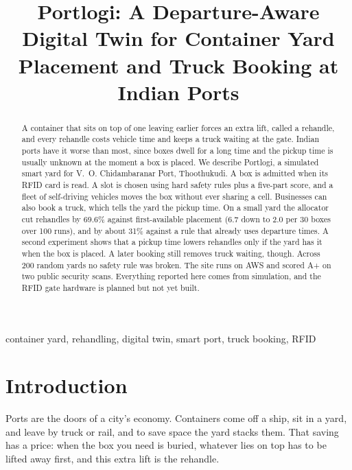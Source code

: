 \documentclass[conference]{IEEEtran}
\begin{document}
\title{Portlogi: A Departure-Aware Digital Twin for Container Yard Placement and Truck Booking at Indian Ports}

\author{
}

\maketitle

\begin{abstract}
A container that sits on top of one leaving earlier forces an extra lift, called a rehandle, and every rehandle costs vehicle time and keeps a truck waiting at the gate. Indian ports have it worse than most, since boxes dwell for a long time and the pickup time is usually unknown at the moment a box is placed. We describe Portlogi, a simulated smart yard for V.~O. Chidambaranar Port, Thoothukudi. A box is admitted when its RFID card is read. A slot is chosen using hard safety rules plus a five-part score, and a fleet of self-driving vehicles moves the box without ever sharing a cell. Businesses can also book a truck, which tells the yard the pickup time. On a small yard the allocator cut rehandles by 69.6\% against first-available placement (6.7 down to 2.0 per 30 boxes over 100 runs), and by about 31\% against a rule that already uses departure times. A second experiment shows that a pickup time lowers rehandles only if the yard has it when the box is placed. A later booking still removes truck waiting, though. Across 200 random yards no safety rule was broken. The site runs on AWS and scored A+ on two public security scans. Everything reported here comes from simulation, and the RFID gate hardware is planned but not yet built.
\end{abstract}

\begin{IEEEkeywords}
container yard, rehandling, digital twin, smart port, truck booking, RFID
\end{IEEEkeywords}

\section{Introduction}
Ports are the doors of a city's economy. Containers come off a ship, sit in a yard, and leave by truck or rail, and to save space the yard stacks them. That saving has a price: when the box you need is buried, whatever lies on top has to be lifted away first, and this extra lift is the rehandle.
\end{document}
